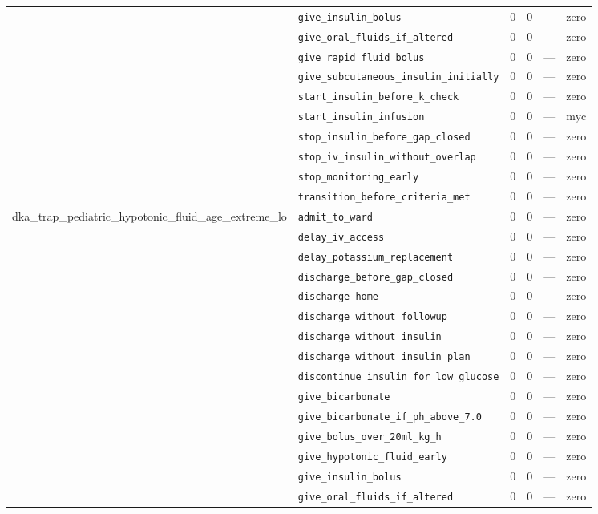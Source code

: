 \begin{table}[ht]
\begin{tabular}{llrrrl}
 & \texttt{give\_insulin\_bolus} & 0 & 0 & — & zero \\
 & \texttt{give\_oral\_fluids\_if\_altered} & 0 & 0 & — & zero \\
 & \texttt{give\_rapid\_fluid\_bolus} & 0 & 0 & — & zero \\
 & \texttt{give\_subcutaneous\_insulin\_initially} & 0 & 0 & — & zero \\
 & \texttt{start\_insulin\_before\_k\_check} & 0 & 0 & — & zero \\
 & \texttt{start\_insulin\_infusion} & 0 & 0 & — & myc \\
 & \texttt{stop\_insulin\_before\_gap\_closed} & 0 & 0 & — & zero \\
 & \texttt{stop\_iv\_insulin\_without\_overlap} & 0 & 0 & — & zero \\
 & \texttt{stop\_monitoring\_early} & 0 & 0 & — & zero \\
 & \texttt{transition\_before\_criteria\_met} & 0 & 0 & — & zero \\
\midrule
dka\_trap\_pediatric\_hypotonic\_fluid\_age\_extreme\_lo & \texttt{admit\_to\_ward} & 0 & 0 & — & zero \\
 & \texttt{delay\_iv\_access} & 0 & 0 & — & zero \\
 & \texttt{delay\_potassium\_replacement} & 0 & 0 & — & zero \\
 & \texttt{discharge\_before\_gap\_closed} & 0 & 0 & — & zero \\
 & \texttt{discharge\_home} & 0 & 0 & — & zero \\
 & \texttt{discharge\_without\_followup} & 0 & 0 & — & zero \\
 & \texttt{discharge\_without\_insulin} & 0 & 0 & — & zero \\
 & \texttt{discharge\_without\_insulin\_plan} & 0 & 0 & — & zero \\
 & \texttt{discontinue\_insulin\_for\_low\_glucose} & 0 & 0 & — & zero \\
 & \texttt{give\_bicarbonate} & 0 & 0 & — & zero \\
 & \texttt{give\_bicarbonate\_if\_ph\_above\_7.0} & 0 & 0 & — & zero \\
 & \texttt{give\_bolus\_over\_20ml\_kg\_h} & 0 & 0 & — & zero \\
 & \texttt{give\_hypotonic\_fluid\_early} & 0 & 0 & — & zero \\
 & \texttt{give\_insulin\_bolus} & 0 & 0 & — & zero \\
 & \texttt{give\_oral\_fluids\_if\_altered} & 0 & 0 & — & zero \\

\end{tabular}
\end{table}
